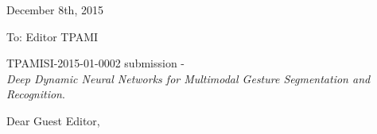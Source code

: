 \documentclass[12pt]{article}
\begin{document}
\begin{center}
\end{center}

\newcommand{\rev}[1]{{\noindent {\bf Comment:} {\it #1}}~\\}
\newcommand{\ans}[1]{{\noindent {\bf Response:} #1}~\\}


\begin{flushleft}
December 8th, 2015
\end{flushleft}

\vspace*{3mm}

\begin{flushleft}
To: Editor TPAMI
\end{flushleft}

\begin{flushleft}
TPAMISI-2015-01-0002 submission - \\
{\em Deep Dynamic Neural Networks for Multimodal Gesture Segmentation and Recognition}.
\end{flushleft}

\vspace*{3mm}

\pagestyle{empty}

\noindent Dear Guest Editor,
\newline
\end{document}

